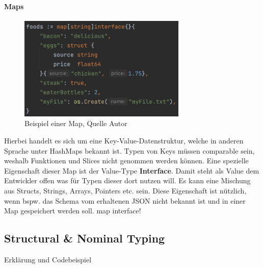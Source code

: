 \documentclass[12pt,titlepage]{article}
\begin{document}
\paragraph{Maps}
\begin{figure}
	\centering
	\includegraphics[width=8cm]{map-example}
	\caption{Beispiel einer Map, Quelle Autor}\label{map}
\end{figure}
Hierbei handelt es sich um eine Key-Value-Datenstruktur, welche in anderen Sprache unter HashMaps bekannt ist.
Typen von Keys müssen comparable sein, weshalb Funktionen und Slices nicht genommen werden können.
Eine spezielle Eigenschaft dieser Map ist der Value-Type \textbf{Interface}.
Damit steht als Value dem Entwickler offen was für Typen dieser dort nutzen will.
Es kann eine Mischung aus Structs, Strings, Arrays, Pointers etc. sein.
Diese Eigenschaft ist nützlich, wenn bspw. das Schema vom erhaltenen JSON nicht bekannt ist und in einer Map gespeichert werden soll.
map interface!

\subsection{Structural \& Nominal Typing}
Erklärung und Codebeispiel
\end{document}

